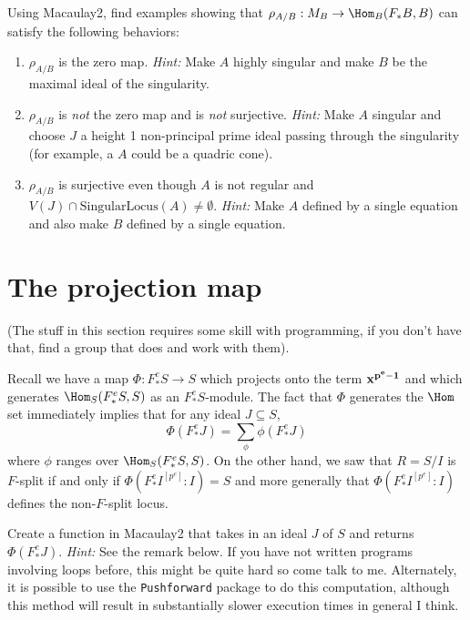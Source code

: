 \documentclass[12pt]{amsart}
\numberwithin{equation}{theorem}
\renewcommand{\:}{\colon}
\begin{document}
\begin{exercise}
Using Macaulay2, find examples showing that $\rho_{A/B} : M_B \to \Hom_B(F_* B, B)$ can satisfy the following behaviors:
\begin{enumerate}
\item $\rho_{A/B}$ is the zero map.
\vskip 3pt
\emph{Hint:} Make $A$ highly singular and make $B$ be the maximal ideal of the singularity.
\item $\rho_{A/B}$ is \emph{not} the zero map and is \emph{not} surjective.
\vskip 3pt
\emph{Hint:} Make $A$ singular and choose $J$ a height 1 non-principal prime ideal passing through the singularity (for example, a $A$ could be a quadric cone).
\item $\rho_{A/B}$ is surjective even though $A$ is not regular and $V(J) \cap \text{SingularLocus}(A) \neq \emptyset$.
\vskip 3pt
\emph{Hint:} Make $A$ defined by a single equation and also make $B$ defined by a single equation.
\end{enumerate}
\end{exercise}

\section{The projection map}

(The stuff in this section requires some skill with programming, if you don't have that, find a group that does and work with them).

Recall we have a map $\Phi : F^e_* S \to S$ which projects onto the term ${\bf x^{p^e - 1}}$ and which generates $\Hom_S(F^e_* S, S)$ as an $F^e_* S$-module.  The fact that $\Phi$ generates the $\Hom$ set immediately implies that for any ideal $J \subseteq S$,
\[
\Phi(F^e_* J) = \sum_{\phi} \phi(F^e_* J)
\]
where $\phi$ ranges over $\Hom_S(F^e_* S, S)$.  On the other hand, we saw that $R = S/I$ is $F$-split if and only if $\Phi(F^e_* I^{[p^e]} : I) = S$ and more generally that $\Phi(F^e_* I^{[p^e]} : I)$ defines the non-$F$-split locus.

\begin{exercise}
Create a function in Macaulay2 that takes in an ideal $J$ of $S$ and returns $\Phi(F^e_* J)$.
\vskip 3pt
\emph{Hint:} See the remark below.  If you have not written programs involving loops before, this might be quite hard so come talk to me.  Alternately, it is possible to use the {\tt Pushforward} package to do this computation, although this method will result in substantially slower execution times in general I think.
\end{exercise}
\end{document}
